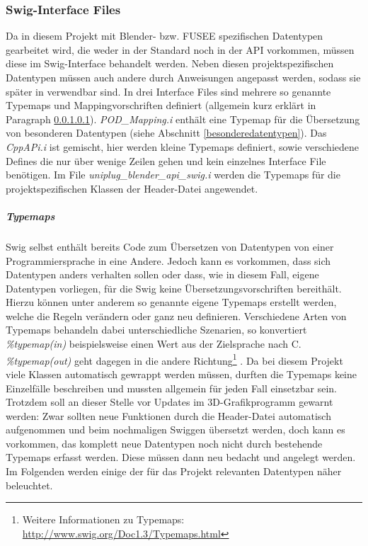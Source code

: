 \subsubsection{Swig-Interface Files}\label{subsubsec:swiginterface}
Da in diesem Projekt mit Blender- bzw. FUSEE spezifischen Datentypen gearbeitet wird, die weder in der Standard \CC noch in der \CS API vorkommen, müssen diese im Swig-Interface behandelt werden. Neben diesen projektspezifischen Datentypen müssen auch andere durch Anweisungen angepasst werden, sodass sie später in \CS verwendbar sind. In drei Interface Files sind mehrere so genannte Typemaps und Mappingvorschriften definiert (allgemein kurz erklärt in Paragraph \ref{typemaps}). \emph{POD\_Mapping.i} enthält eine Typemap für die Übersetzung von besonderen Datentypen (siehe Abschnitt \ref{besonderedatentypen}). Das \emph{CppAPi.i} ist gemischt, hier werden kleine Typemaps definiert, sowie verschiedene Defines die nur über wenige Zeilen gehen und kein einzelnes Interface File benötigen. Im File \emph{uniplug\_blender\_api\_swig.i} werden die Typemaps für die projektspezifischen Klassen der Header-Datei angewendet.

\subparagraph{Typemaps}\label{typemaps}
Swig selbst enthält bereits Code zum Übersetzen von Datentypen von einer Programmiersprache in eine Andere. Jedoch kann es vorkommen, dass sich Datentypen anders verhalten sollen oder dass, wie in diesem Fall, eigene Datentypen vorliegen, für die Swig keine Übersetzungsvorschriften bereithält. Hierzu können unter anderem so genannte eigene Typemaps erstellt werden, welche die Regeln verändern oder ganz neu definieren. Verschiedene Arten von Typemaps behandeln dabei unterschiedliche Szenarien, so konvertiert \emph{\%typemap(in)} beispielsweise einen Wert aus der Zielsprache nach C. \emph{\%typemap(out)} geht dagegen in die andere Richtung\footnote{Weitere Informationen zu Typemaps: \url{http://www.swig.org/Doc1.3/Typemaps.html}} . Da bei diesem Projekt viele Klassen automatisch gewrappt werden müssen, durften die Typemaps keine Einzelfälle beschreiben und mussten allgemein für jeden Fall einsetzbar sein. Trotzdem soll an dieser Stelle vor Updates im 3D-Grafikprogramm gewarnt werden: Zwar sollten neue Funktionen durch die Header-Datei automatisch aufgenommen und beim nochmaligen Swiggen übersetzt werden, doch kann es vorkommen, das komplett neue Datentypen noch nicht durch bestehende Typemaps erfasst werden. Diese müssen dann neu bedacht und angelegt werden. Im Folgenden werden einige der für das Projekt relevanten Datentypen näher beleuchtet.

